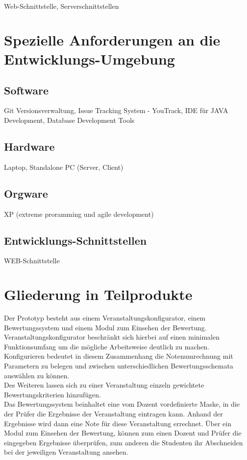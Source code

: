 		Web-Schnittstelle, Serverschnittstellen
		
	\section{Spezielle Anforderungen an die Entwicklungs-Umgebung}
		\subsection{Software}
		Git Versionsverwaltung, Issue Tracking System - YouTrack, IDE für JAVA Development, Database Development Tools
		
		\subsection{Hardware}
		Laptop, Standalone PC (Server, Client)
		\subsection{Orgware}
		XP (extreme proramming und agile development)	
		\subsection{Entwicklungs-Schnittstellen}
		WEB-Schnittstelle
		
	\section{Gliederung in Teilprodukte}
	Der Prototyp besteht aus einem  Veranstaltungskonfigurator, einem Bewertungssystem und einem Modul zum Einsehen der Bewertung.\\
	Veranstaltungskonfigurator beschränkt sich hierbei auf einen minimalen Funktionsumfang um die mögliche Arbeitsweise deutlich zu machen.\\ 
	Konfigurieren bedeutet in diesem Zusammenhang die Notenumrechnung mit Parametern zu belegen und zwischen unterschiedlichen Bewertungsschemata auswählen zu können.\\ 
	Des Weiteren lassen sich zu einer Veranstaltung einzeln gewichtete Bewertungskriterien hinzufügen.\\ 
	Das Bewertungssystem beinhaltet eine vom Dozent vordefinierte Maske, in die der Prüfer die Ergebnisse der Veranstaltung eintragen kann. Anhand der Ergebnisse wird dann eine Note für diese Veranstaltung errechnet.
	Über ein Modul zum Einsehen der Bewertung, können zum einen Dozent und Prüfer die eingegeben Ergebnisse überprüfen, zum anderen die Studenten ihr Abschneiden bei der jeweiligen Veranstaltung ansehen.
		
